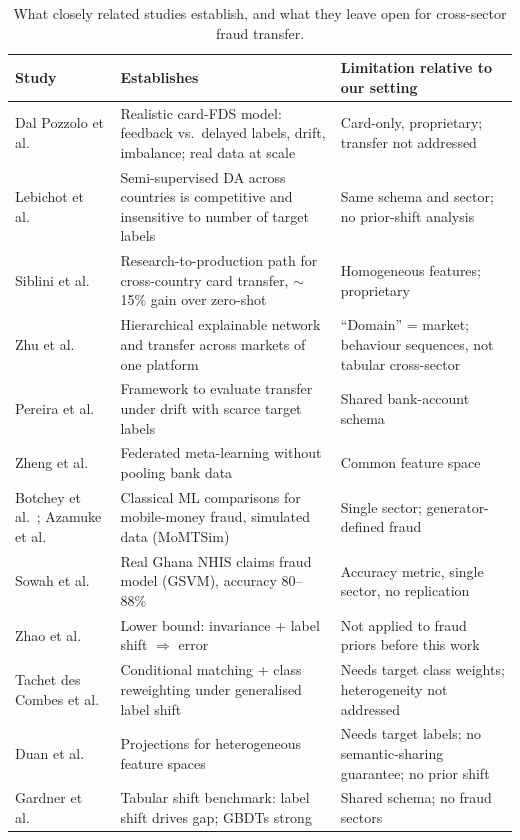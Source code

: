 \documentclass[journal]{IEEEtran}
\newcommand{\1}{\mathbf{1}}
\begin{document}
\begin{table}[t]
\centering
\caption{What closely related studies establish, and what they leave open for cross-sector fraud transfer.}
\label{tab:review}
\scriptsize
\begin{tabular}{@{}p{3.1cm}p{5.6cm}p{6.8cm}@{}}
\toprule
Study & Establishes & Limitation relative to our setting \\
\midrule
Dal Pozzolo et al.\ \cite{dalpozzolo2018realistic} & Realistic card-FDS model: feedback vs.\ delayed labels, drift, imbalance; real data at scale & Card-only, proprietary; transfer not addressed \\
Lebichot et al.\ \cite{lebichot2021transfer} & Semi-supervised DA across countries is competitive and insensitive to number of target labels & Same schema and sector; no prior-shift analysis \\
Siblini et al.\ \cite{siblini2021transfer} & Research-to-production path for cross-country card transfer, $\sim$15\% gain over zero-shot & Homogeneous features; proprietary \\
Zhu et al.\ \cite{zhu2020hen} & Hierarchical explainable network and transfer across markets of one platform & ``Domain'' = market; behaviour sequences, not tabular cross-sector \\
Pereira et al.\ \cite{pereira2025evaluating} & Framework to evaluate transfer under drift with scarce target labels & Shared bank-account schema \\
Zheng et al.\ \cite{zheng2020federated} & Federated meta-learning without pooling bank data & Common feature space \\
Botchey et al.\ \cite{botchey2020mobile}; Azamuke et al.\ \cite{azamuke2025rich} & Classical ML comparisons for mobile-money fraud, simulated data (MoMTSim) & Single sector; generator-defined fraud \\
Sowah et al.\ \cite{sowah2019dss} & Real Ghana NHIS claims fraud model (GSVM), accuracy 80--88\% & Accuracy metric, single sector, no replication \\
Zhao et al.\ \cite{zhao2019invariant} & Lower bound: invariance + label shift $\Rightarrow$ error & Not applied to fraud priors before this work \\
Tachet des Combes et al.\ \cite{tachet2020gls} & Conditional matching + class reweighting under generalised label shift & Needs target class weights; heterogeneity not addressed \\
Duan et al.\ \cite{duan2012hfa} & Projections for heterogeneous feature spaces & Needs target labels; no semantic-sharing guarantee; no prior shift \\
Gardner et al.\ \cite{gardner2023tableshift} & Tabular shift benchmark: label shift drives gap; GBDTs strong & Shared schema; no fraud sectors \\
\bottomrule
\end{tabular}
\end{table}
\end{document}
